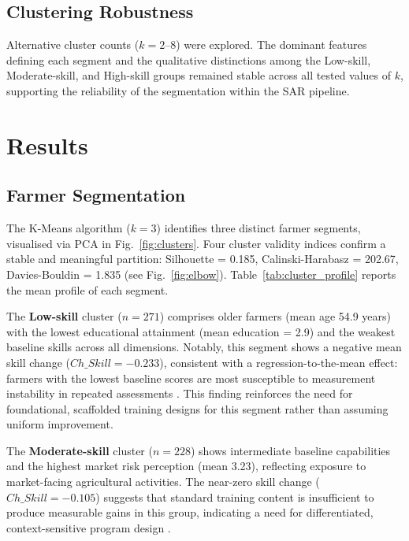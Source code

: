 \documentclass[3p,twocolumn,authoryear]{elsarticle}
\begin{document}
\subsection{Clustering Robustness}

Alternative cluster counts ($k = 2$--$8$) were explored.
The dominant features defining each segment and the qualitative
distinctions among the Low-skill, Moderate-skill, and High-skill groups
remained stable across all tested values of $k$, supporting the
reliability of the segmentation within the SAR pipeline.

\section{Results}

\subsection{Farmer Segmentation}

The K-Means algorithm ($k = 3$) identifies three distinct farmer segments,
visualised via PCA in Fig.~\ref{fig:clusters}.
Four cluster validity indices confirm a stable and meaningful partition:
Silhouette = 0.185, Calinski-Harabasz = 202.67, Davies-Bouldin = 1.835
(see Fig.~\ref{fig:elbow}).
Table~\ref{tab:cluster_profile} reports the mean profile of each segment.

The \textbf{Low-skill} cluster ($n = 271$) comprises older farmers
(mean age 54.9 years) with the lowest educational attainment
(mean education = 2.9) and the weakest baseline skills across all
dimensions.
Notably, this segment shows a negative mean skill change
($Ch\_Skill = -0.233$), consistent with a regression-to-the-mean effect:
farmers with the lowest baseline scores are most susceptible to
measurement instability in repeated assessments \citep{davis2012}.
This finding reinforces the need for foundational, scaffolded training
designs for this segment rather than assuming uniform improvement.

The \textbf{Moderate-skill} cluster ($n = 228$) shows intermediate
baseline capabilities and the highest market risk perception (mean 3.23),
reflecting exposure to market-facing agricultural activities.
The near-zero skill change ($Ch\_Skill = -0.105$) suggests that standard
training content is insufficient to produce measurable gains in this
group, indicating a need for differentiated, context-sensitive program
design \citep{anderson2004}.
\end{document}
